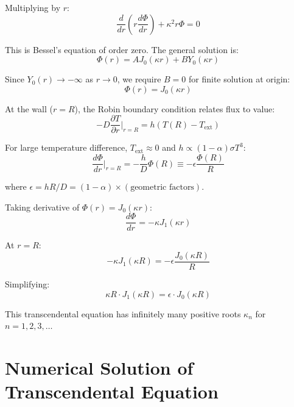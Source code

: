 \documentclass[12pt,a4paper]{article}
\begin{document}
Multiplying by $r$:
\begin{equation}
\frac{d}{dr}\left(r\frac{d\Phi}{dr}\right) + \kappa^2 r \Phi = 0
\end{equation}

This is Bessel's equation of order zero. The general solution is:
\begin{equation}
\Phi(r) = A J_0(\kappa r) + B Y_0(\kappa r)
\end{equation}

Since $Y_0(r) \to -\infty$ as $r \to 0$, we require $B=0$ for finite solution at origin:
\begin{equation}
\Phi(r) = J_0(\kappa r)
\end{equation}

At the wall ($r=R$), the Robin boundary condition relates flux to value:
\begin{equation}
-D \frac{\partial T}{\partial r}\bigg|_{r=R} = h (T(R) - T_{\text{ext}})
\end{equation}

For large temperature difference, $T_{\text{ext}} \approx 0$ and $h \propto (1-\alpha)\sigma T^3$:
\begin{equation}
\frac{d\Phi}{dr}\bigg|_{r=R} = -\frac{h}{D} \Phi(R) \equiv -\epsilon \frac{\Phi(R)}{R}
\end{equation}

where $\epsilon = hR/D = (1-\alpha) \times (\text{geometric factors})$.

Taking derivative of $\Phi(r) = J_0(\kappa r)$:
\begin{equation}
\frac{d\Phi}{dr} = -\kappa J_1(\kappa r)
\end{equation}

At $r=R$:
\begin{equation}
-\kappa J_1(\kappa R) = -\epsilon \frac{J_0(\kappa R)}{R}
\end{equation}

Simplifying:
\begin{equation}
\boxed{\kappa R \cdot J_1(\kappa R) = \epsilon \cdot J_0(\kappa R)}
\end{equation}

This transcendental equation has infinitely many positive roots $\kappa_n$ for $n=1,2,3,\ldots$

\section{Numerical Solution of Transcendental Equation}
\end{document}
